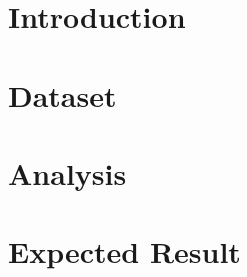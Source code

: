 \documentclass[paper=a4, fontsize=12pt]{scrartcl}
\numberwithin{equation}{section}		%
\numberwithin{figure}{section}			%
\numberwithin{table}{section}				%
\begin{document}
	
	\section{Introduction}
	
	\section{Dataset}
	
	\section{Analysis}
	
	\section{Expected Result}
	
	\clearpage
\end{document}
